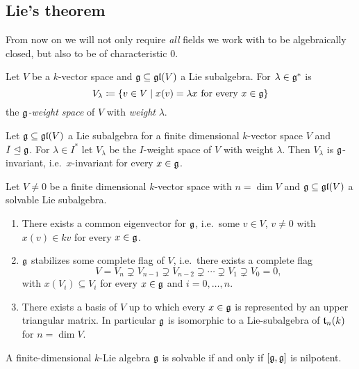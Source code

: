 \subsection{Lie’s theorem}


From now on we will not only require \emph{all} fields we work with to be algebraically closed, but also to be of characteristic $0$.


\begin{defi}
 Let $V$ be a $k$-vector space and $\mathfrak{g} \subseteq \mathfrak{gl}(V)$ a Lie subalgebra. For $\lambda \in \mathfrak{g}^*$ is
 \[
  V_\lambda \coloneqq \{v \in V \mid \text{$x(v) = \lambda x$ for every $x \in \mathfrak{g}$}\}
 \]
 the \emph{$\mathfrak{g}$-weight space} of $V$ with \emph{weight} $\lambda$.
\end{defi}



\begin{lem}
 Let $\mathfrak{g} \subseteq \mathfrak{gl}(V)$ a Lie subalgebra for a finite dimensional $k$-vector space $V$ and $I \trianglelefteq \mathfrak{g}$. For $\lambda \in I^*$ let $V_\lambda$ be the $I$-weight space of $V$ with weight $\lambda$. Then $V_\lambda$ is $\mathfrak{g}$-invariant, i.e.\ $x$-invariant for every $x \in \mathfrak{g}$.
\end{lem}


\begin{thrm}[Lie]
 Let $V \neq 0$ be a finite dimensional $k$-vector space with $n = \dim V$ and $\mathfrak{g} \subseteq \mathfrak{gl}(V)$ a solvable Lie subalgebra.
 \begin{enumerate}[leftmargin=*]
  \item
   There exists a common eigenvector for $\mathfrak{g}$, i.e.\ some $v \in V$, $v \neq 0$ with $x(v) \in k v$ for every $x \in \mathfrak{g}$.
  \item
   $\mathfrak{g}$ stabilizes some complete flag of $V$, i.e.\ there exists a complete flag
   \[
    V = V_n \supsetneq V_{n-1} \supsetneq V_{n-2} \supsetneq \dotsb \supsetneq V_1 \supsetneq V_0 = 0,
   \]
   with $x(V_i) \subseteq V_i$ for every $x \in \mathfrak{g}$ and $i = 0, \dotsc, n$.
  \item
   There exists a basis of $V$ up to which every $x \in \mathfrak{g}$ is represented by an upper triangular matrix. In particular $\mathfrak{g}$ is isomorphic to a Lie-subalgebra of $\mathfrak{t}_n(k)$ for $n = \dim V$.
 \end{enumerate}
\end{thrm}


\begin{cor}
 A finite-dimensional $k$-Lie algebra $\mathfrak{g}$ is solvable if and only if $[\mathfrak{g},\mathfrak{g}]$ is nilpotent.
\end{cor}





